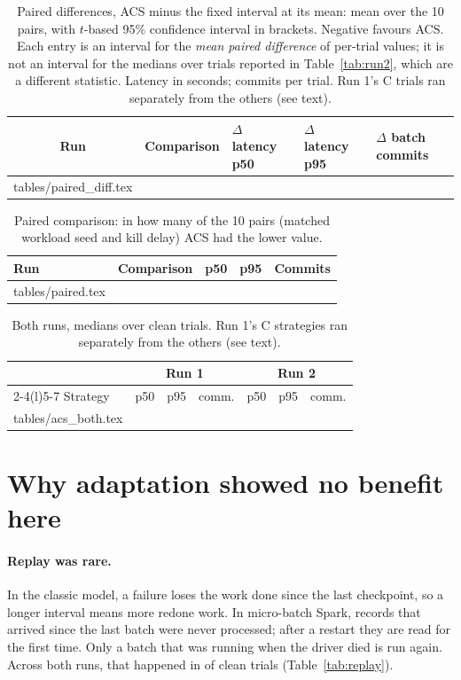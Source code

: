 \documentclass[10pt,twocolumn]{article}
\makeatletter
\def\BothRows{\@@input tables/acs_both.tex }
\def\PairRows{\@@input tables/paired.tex }
\def\DiffRows{\@@input tables/paired_diff.tex }
\makeatother
\begin{document}
\begin{table}[t]
\centering\small
\caption{Paired differences, ACS minus the fixed interval at its mean: mean over
the 10 pairs, with $t$-based 95\% confidence interval in brackets. Negative
favours ACS. Each entry is an interval for the \emph{mean paired difference} of
per-trial values; it is not an interval for the medians over trials reported in
Table~\ref{tab:run2}, which are a different statistic. Latency in seconds; commits per trial. Run 1's C trials ran
separately from the others (see text).}
\label{tab:diff}
\begin{tabular}{@{}cllll@{}}
\toprule
Run & Comparison & $\Delta$ latency p50 & $\Delta$ latency p95 & $\Delta$ batch commits \\
\midrule
\DiffRows
\bottomrule
\end{tabular}
\end{table}

\begin{table}[t]
\centering\small
\caption{Paired comparison: in how many of the 10 pairs (matched workload seed
and kill delay) ACS had the lower value.}
\label{tab:paired}
\setlength{\tabcolsep}{3pt}
\begin{tabular}{@{}llccc@{}}
\toprule
Run & Comparison & p50 & p95 & Commits \\
\midrule
\PairRows
\bottomrule
\end{tabular}
\end{table}

\begin{table}[t]
\centering\small
\caption{Both runs, medians over clean trials. Run 1's C strategies ran
separately from the others (see text).}
\label{tab:both}
\setlength{\tabcolsep}{3pt}
\begin{tabular}{@{}lrrrrrr@{}}
\toprule
 & \multicolumn{3}{c}{Run 1} & \multicolumn{3}{c}{Run 2} \\
\cmidrule(lr){2-4}\cmidrule(l){5-7}
Strategy & p50 & p95 & comm. & p50 & p95 & comm. \\
\midrule
\BothRows
\bottomrule
\end{tabular}
\end{table}

\section{Why adaptation showed no benefit here}
\label{sec:mechanism}

\paragraph{Replay was rare.}
In the classic model, a failure loses the work done since the last checkpoint,
so a longer interval means more redone work. In micro-batch Spark, records that
arrived since the last batch were never processed; after a restart they are
read for the first time. Only a batch that was running when the driver died is
run again. Across both runs, that happened in \ReplayEvents{} of
\CleanTrials{} clean trials (Table~\ref{tab:replay}).
\end{document}
